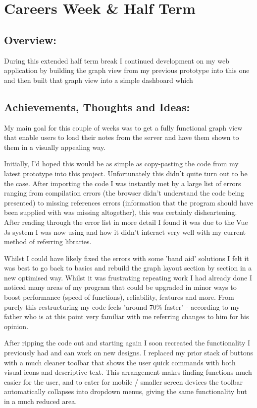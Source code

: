 \section{Careers Week \& Half Term}

\subsection*{Overview:}
During this extended half term break I continued development on my web application by building the graph view from my previous prototype into this one and then built that graph view into a simple dashboard which 

\subsection*{Achievements, Thoughts and Ideas:}
My main goal for this couple of weeks was to get a fully functional graph view that enable users to load their notes from the server and have them shown to them in a visually appealing way. 

Initially, I'd hoped this would be as simple as copy-pasting the code from my latest prototype into this project. Unfortunately this didn't quite turn out to be the case. After importing the code I was instantly met by a large list of errors ranging from compilation errors (the browser didn't understand the code being presented) to missing references errors (information that the program should have been supplied with was missing altogether), this was certainly disheartening. After reading through the error list in more detail I found it was due to the Vue Js system I was now using and how it didn't interact very well with my current method of referring libraries.

Whilst I could have likely fixed the errors with some 'band aid' solutions I felt it was best to go back to basics and rebuild the graph layout section by section in a new optimised way. Whilst it was frustrating repeating work I had already done I noticed many areas of my program that could be upgraded in minor ways to boost performance (speed of functions), reliability, features and more. From purely this restructuring my code feels "around 70\% faster" - according to my father who is at this point very familiar with me referring changes to him for his opinion.

After ripping the code out and starting again I soon recreated the functionality I previously had and can work on new designs. I replaced my prior stack of buttons with a much cleaner toolbar that shows the user quick commands with both visual icons and descriptive text. This arrangement makes finding functions much easier for the user, and to cater for mobile / smaller screen devices the toolbar automatically collapses into dropdown menus, giving the same functionality but in a much reduced area.

